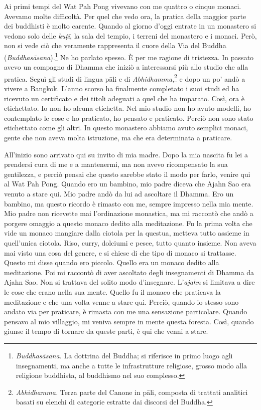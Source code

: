 Ai primi tempi del Wat Pah Pong vivevano con me quattro o cinque monaci.
Avevamo molte difficoltà. Per quel che vedo ora, la pratica della
maggior parte dei buddhisti è molto carente. Quando al giorno d'oggi
entrate in un monastero si vedono solo delle \emph{kuṭī}, la sala del
tempio, i terreni del monastero e i monaci. Però, non si vede ciò che
veramente rappresenta il cuore della Via del Buddha
(\emph{Buddhasāsana}).\footnote{\emph{Buddhasāsana.} La dottrina del
  Buddha; si riferisce in primo luogo agli insegnamenti, ma anche a
  tutte le infrastrutture religiose, grosso modo alla religione
  buddhista, al buddhismo nel suo complesso.} Ne ho parlato spesso. È
per me ragione di tristezza. In passato avevo un compagno di Dhamma che
iniziò a interessarsi più allo studio che alla pratica. Seguì gli studi
di lingua pāli e di \emph{Abhidhamma},\footnote{\emph{Abhidhamma.} Terza
  parte del Canone in pāli, composta di trattati analitici basati su
  elenchi di categorie estratte dai discorsi del Buddha.} e dopo un po'
andò a vivere a Bangkok. L'anno scorso ha finalmente completato i suoi
studi ed ha ricevuto un certificato e dei titoli adeguati a quel che ha
imparato. Così, ora è etichettato. Io non ho alcuna etichetta. Nel mio
studio non ho avuto modelli, ho contemplato le cose e ho praticato, ho
pensato e praticato. Perciò non sono stato etichettato come gli altri.
In questo monastero abbiamo avuto semplici monaci, gente che non aveva
molta istruzione, ma che era determinata a praticare.

All'inizio sono arrivato qui su invito di mia madre. Dopo la mia nascita
fu lei a prendersi cura di me e a mantenermi, ma non avevo ricompensato
la sua gentilezza, e perciò pensai che questo sarebbe stato il modo per
farlo, venire qui al Wat Pah Pong. Quando ero un bambino, mio padre
diceva che Ajahn Sao era venuto a stare qui. Mio padre andò da lui ad
ascoltare il Dhamma. Ero un bambino, ma questo ricordo è rimasto con me,
sempre impresso nella mia mente. Mio padre non ricevette mai
l'ordinazione monastica, ma mi raccontò che andò a porgere omaggio a
questo monaco dedito alla meditazione. Fu la prima volta che vide un
monaco mangiare dalla ciotola per la questua, metteva tutto assieme in
quell'unica ciotola. Riso, curry, dolciumi e pesce, tutto quanto
insieme. Non aveva mai visto una cosa del genere, e si chiese di che
tipo di monaco si trattasse. Questo mi disse quando ero piccolo. Quello
era un monaco dedito alla meditazione. Poi mi raccontò di aver ascoltato
degli insegnamenti di Dhamma da Ajahn Sao. Non si trattava del solito
modo d'insegnare. L'\emph{ajahn} si limitava a dire le cose che erano
nella sua mente. Quello fu il monaco che praticava la meditazione e che
una volta venne a stare qui. Perciò, quando io stesso sono andato via
per praticare, è rimasta con me una sensazione particolare. Quando
pensavo al mio villaggio, mi veniva sempre in mente questa foresta.
Così, quando giunse il tempo di tornare da queste parti, è qui che venni
a stare.

